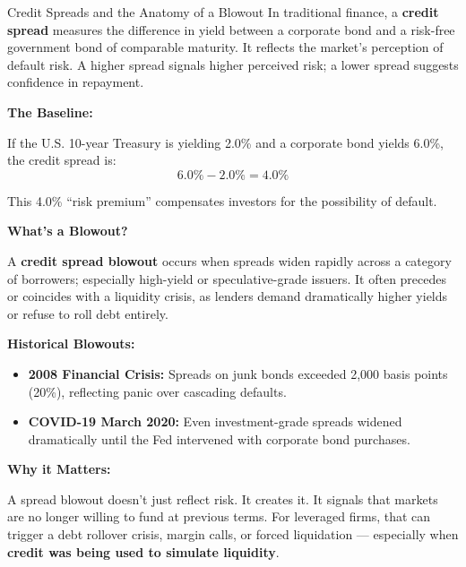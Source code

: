 \begin{TechnicalSidebar}{Credit Spreads and the Anatomy of a Blowout}
  In traditional finance, a \textbf{credit spread} measures the difference in yield between a corporate bond and a risk-free government bond of comparable maturity. It reflects the market’s perception of default risk. A higher spread signals higher perceived risk; a lower spread suggests confidence in repayment.
  
  \medskip
  
  \textbf{The Baseline:}  

  \medskip

  If the U.S. 10-year Treasury is yielding 2.0\% and a corporate bond yields 6.0\%, the credit spread is:
  \[
  6.0\% - 2.0\% = 4.0\%
  \]

  \medskip
  
  This 4.0\% “risk premium” compensates investors for the possibility of default.
  
  \medskip
  
  \textbf{What’s a Blowout?}  

  \medskip

  A \textbf{credit spread blowout} occurs when spreads widen rapidly across a category of borrowers; especially high-yield or speculative-grade issuers. It often precedes or coincides with a liquidity crisis, as lenders demand dramatically higher yields or refuse to roll debt entirely.
  
  \medskip
  
  \textbf{Historical Blowouts:}

  \medskip

  \begin{itemize}
    \item \textbf{2008 Financial Crisis:} Spreads on junk bonds exceeded 2,000 basis points (20\%), reflecting panic over cascading defaults.
    \item \textbf{COVID-19 March 2020:} Even investment-grade spreads widened dramatically until the Fed intervened with corporate bond purchases.
  \end{itemize}

  \medskip
  
  \textbf{Why it Matters:}  

  \medskip

  A spread blowout doesn’t just reflect risk. It creates it. It signals that markets are no longer willing to fund at previous terms. For leveraged firms, that can trigger a debt rollover crisis, margin calls, or forced liquidation — especially when \textbf{credit was being used to simulate liquidity}.

\end{TechnicalSidebar}

